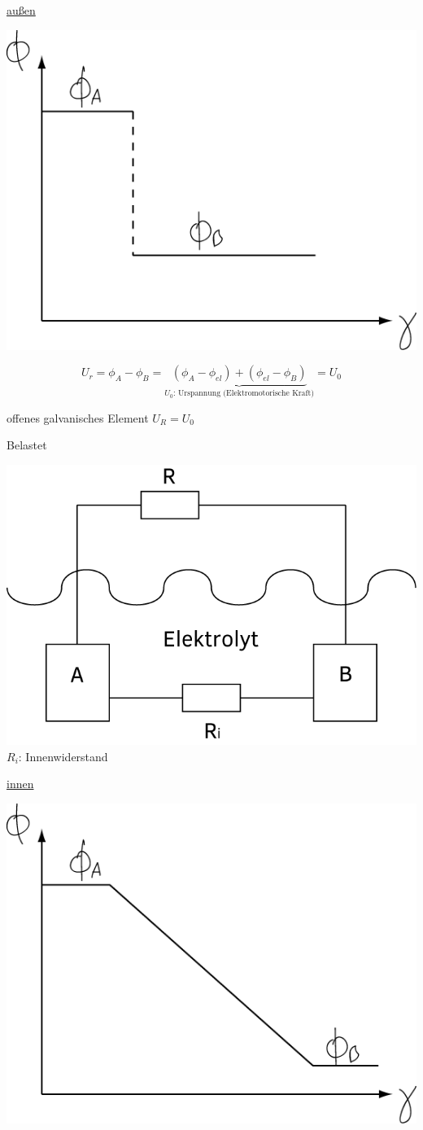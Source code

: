\underline{außen}

\begin{center}
	\includegraphics[width=0.5\linewidth]{skizzen/15/15_6/15_6B3}
\end{center}

$$ U_r = \phi_A-\phi_B = \underbrace{(\phi_A - \phi_{el}) + (\phi_{el}-\phi_B)}_{U_0\text{: Urspannung (Elektromotorische Kraft)}}  = U_0 $$

offenes galvanisches Element $ U_R = U_0 $

\hfill\break

Belastet

\begin{center}
	\includegraphics[width=0.4\linewidth]{skizzen/15/15_6/15_6B4}\\
	$ R_i $: Innenwiderstand
\end{center}



\underline{innen}

\begin{center}
	\includegraphics[width=0.5\linewidth]{skizzen/15/15_6/15_6B5}
\end{center}

